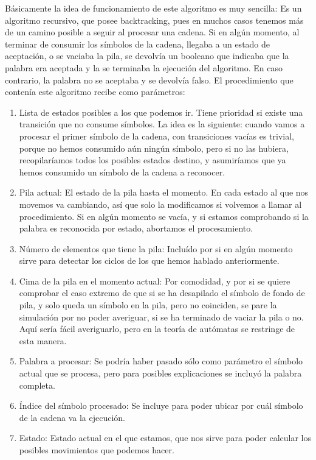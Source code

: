\documentclass[12pt,a4paper,spanish]{book}
\begin{document}
B\'asicamente la idea de funcionamiento de este algoritmo es muy sencilla: Es un algoritmo recursivo, que posee backtracking, pues en muchos casos tenemos m\'as de un camino posible a seguir al procesar una cadena. Si en alg\'un momento, al terminar de consumir los s\'imbolos de la cadena, llegaba a un estado de aceptaci\'on, o se vaciaba la pila, se devolv\'ia un booleano que indicaba que la palabra era aceptada y la se terminaba la ejecuci\'on del algoritmo. En caso contrario, la palabra no se aceptaba y se devolv\'ia falso.
El procedimiento que conten\'ia este algoritmo recibe como par\'ametros:
\begin{enumerate}
\item Lista de estados posibles a los que podemos ir. Tiene prioridad si existe una transici\'on que no consume s\'imbolos. La idea es la siguiente: cuando vamos a procesar el primer s\'imbolo de la cadena, con transiciones vac\'ias es trivial, porque no hemos consumido a\'un ning\'un s\'imbolo, pero si no las hubiera, recopilar\'iamos todos los posibles estados destino, y asumir\'iamos que ya hemos consumido un s\'imbolo de la cadena a reconocer.
\item Pila actual: El estado de la pila hasta el momento. En cada estado al que nos movemos va cambiando, as\'i que solo la modificamos si volvemos a llamar al procedimiento. Si en alg\'un momento se vac\'ia, y si estamos comprobando si la palabra es reconocida por estado, abortamos el procesamiento.
\item N\'umero de elementos que tiene la pila: Inclu\'ido por si en alg\'un momento sirve para detectar los ciclos de los que hemos hablado anteriormente.
\item Cima de la pila en el momento actual: Por comodidad, y por si se quiere comprobar el caso extremo de que si se ha desapilado el s\'imbolo de fondo de pila, y solo queda un s\'imbolo en la pila, pero no coinciden, se pare la simulaci\'on por no poder averiguar, si se ha terminado de vaciar la pila o no. Aqu\'i ser\'ia f\'acil averiguarlo, pero en la teor\'ia de aut\'omatas se restringe de esta manera.
\item Palabra a procesar: Se podr\'ia haber pasado s\'olo como par\'ametro el s\'imbolo actual que se procesa, pero para posibles explicaciones se incluy\'o la palabra completa.
\item \'Indice del s\'imbolo procesado: Se incluye para poder ubicar por cu\'al s\'imbolo de la cadena va la ejecuci\'on.
\item Estado: Estado actual en el que estamos, que nos sirve para poder calcular los posibles movimientos que podemos hacer.
\end{enumerate}
\end{document}
